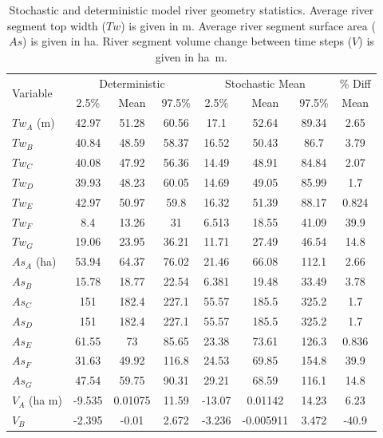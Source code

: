 \begin{linenumbers}
\begin{table}[htbp]
  \centering
  \caption[Stochastic and deterministic model river geometry statistics.]{Stochastic and deterministic model river geometry statistics.  Average river segment top width ($Tw$) is given in \si{\meter}.  Average river segment surface area ($As$) is given in \si{\hectare}.  River segment volume change between time steps ($V$) is given in \si{\hectare\meter}.}
  \label{tab:WAVResults}
    \begin{tabular}{l|ccc|ccc|c}
   \toprule
    \multirow{2}[0]{*}{Variable} & \multicolumn{3}{c}{Deterministic} & \multicolumn{3}{c}{Stochastic Mean} & \% Diff\\\cline{2-4} \cline{5-7}
    & 2.5\% & Mean & 97.5\% & 2.5\% & Mean & 97.5\% & Mean\\
    \midrule
    \midrule
	$Tw_{A}$ (m)&	42.97&	51.28&	60.56&	17.1&	52.64&	89.34&	2.65\\         
	$Tw_{B}$&		40.84&	48.59&	58.37&	16.52&	50.43&	86.7&	3.79\\         
	$Tw_{C}$&		40.08&	47.92&	56.36&	14.49&	48.91&	84.84&	2.07\\         
	$Tw_{D}$&		39.93&	48.23&	60.05&	14.69&	49.05&	85.99&	1.7\\          
	$Tw_{E}$&		42.97&	50.97&	59.8&	16.32&	51.39&	88.17&	0.824\\        
	$Tw_{F}$&		8.4&	13.26&	31&	6.513&	18.55&	41.09&	39.9\\             
	$Tw_{G}$&		19.06&	23.95&	36.21&	11.71&	27.49&	46.54&	14.8\\         
	\midrule        
	$As_{A}$ (ha)&	53.94&	64.37&	76.02&	21.46&	66.08&	112.1&	2.66\\         
	$As_{B}$&		15.78&	18.77&	22.54&	6.381&	19.48&	33.49&	3.78\\         
	$As_{C}$&		151&	182.4&	227.1&	55.57&	185.5&	325.2&	1.7\\          
	$As_{D}$&		151&	182.4&	227.1&	55.57&	185.5&	325.2&	1.7\\          
	$As_{E}$&		61.55&	73&	85.65&	23.38&	73.61&	126.3&	0.836\\            
	$As_{F}$&		31.63&	49.92&	116.8&	24.53&	69.85&	154.8&	39.9\\         
	$As_{G}$&		47.54&	59.75&	90.31&	29.21&	68.59&	116.1&	14.8\\         
	\midrule        
	$V_{A}$ (ha m)&	-9.535&	0.01075&	11.59&	-13.07&	0.01142&	14.23&	6.23\\ 
	$V_{B}$&		-2.395&	-0.01&	2.672&	-3.236&	-0.005911&	3.472&	-40.9\\    

\end{tabular}
\end{table}
\end{linenumbers}
